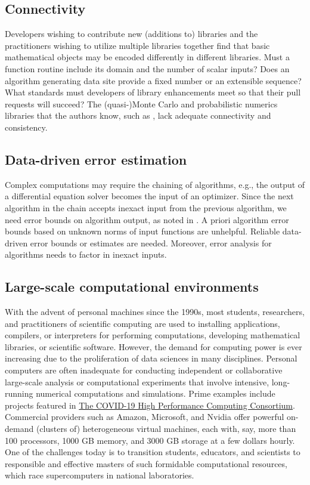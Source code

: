 \documentclass{amsart}
\begin{document}
\subsection{Connectivity} 
Developers wishing to contribute new (additions to) libraries and the practitioners wishing to utilize multiple libraries together find that basic mathematical objects may be encoded differently in different libraries.  Must a function routine include its domain and the number of scalar inputs?  Does an algorithm generating data site provide a fixed number or an extensible sequence?  What standards must developers of library enhancements meet so that their pull requests will succeed? The (quasi-)Monte Carlo and probabilistic numerics libraries that the authors know, such as \cite{QMCPy2020a,SciPyQMC,STAN,probnum}, lack  adequate connectivity and consistency.

\subsection{Data-driven error estimation} 
Complex computations may require the chaining of algorithms, e.g., the output of a differential equation solver becomes the input of an optimizer.  Since the next algorithm in the chain accepts inexact input from the previous algorithm, 
we need error bounds on algorithm output, as noted in \cite{Ips21a}. A priori algorithm error bounds based on unknown norms of input functions are unhelpful.  Reliable data-driven error bounds or estimates are needed. Moreover, error analysis for algorithms needs to factor in inexact inputs.

\subsection{Large-scale computational environments} 
With the advent of personal machines since the 1990s, most students, researchers, and practitioners of scientific computing are used to installing applications, compilers, or interpreters for performing computations, developing mathematical libraries, or scientific software. However, the demand for computing power is ever increasing due to the proliferation of data sciences in many disciplines. Personal computers are often inadequate for conducting independent or collaborative large-scale analysis or computational experiments that involve intensive, long-running numerical computations and simulations. Prime examples include projects featured in \href{https://covid19-hpc-consortium.org}{The COVID-19 High Performance Computing Consortium}. Commercial providers such as Amazon, Microsoft, and Nvidia offer powerful on-demand (clusters of) heterogeneous virtual machines, each with, say, more than 100 processors, 1000 GB memory, and 3000 GB storage at a few dollars hourly. One of the challenges today is to transition students, educators, and scientists to responsible and effective masters of such formidable computational resources, which race supercomputers in national laboratories.
\end{document}
